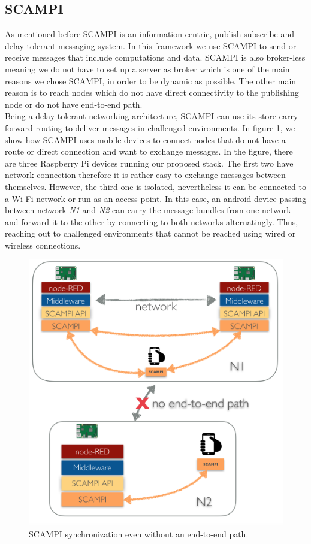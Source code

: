 \subsection{SCAMPI}
As mentioned before SCAMPI is an information-centric, publish-subscribe and delay-tolerant messaging system. In this framework we use SCAMPI to send or receive messages that include computations and data. SCAMPI is also broker-less meaning we do not have to set up a server as broker which is one of the main reasons we chose SCAMPI, in order to be dynamic as possible. The other main reason is to reach nodes which do not have direct connectivity to the publishing node or do not have end-to-end path. \\

\noindent Being a delay-tolerant networking architecture, SCAMPI can use its store-carry-forward routing to deliver messages in challenged environments. In figure \ref{fig:scampi-design}, we show how SCAMPI uses mobile devices to connect nodes that do not have a route or  direct connection and want to exchange messages. In the figure, there are three Raspberry Pi devices running our proposed stack. The first two  have network connection therefore it is rather easy to exchange messages between themselves. However, the third one is isolated, nevertheless it can be connected to a Wi-Fi network or run as an access point. In this case, an android device passing  between network \textit{N1} and \textit{N2} can carry the message bundles from one network and forward it to the other by connecting to both networks alternatingly.  Thus, reaching out to challenged environments that cannot be reached using wired or wireless connections.

\begin{figure}[H]
	\centering
	\includegraphics[scale=0.4]{images/scampi.png}
	\caption{SCAMPI synchronization even without an end-to-end path. }
	\label{fig:scampi-design}
\end{figure}

